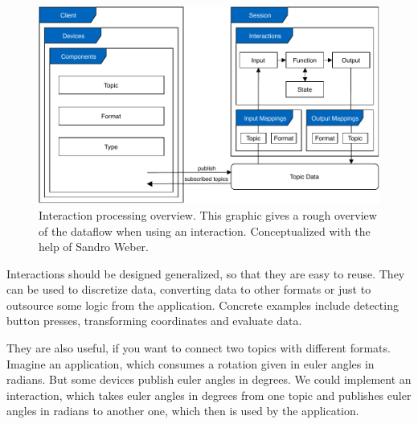 \begin{figure}[htpb]
  \centering
  \includegraphics[width=12cm]{figures/ubii_cd.pdf}
  \caption[UBII Communication Diagram]{Interaction processing overview. This graphic gives a rough overview of the dataflow when using an interaction. Conceptualized with the help of Sandro Weber.}\label{fig:ubii_cd}
\end{figure}

Interactions should be designed generalized, so that they are easy to reuse. They can be used to discretize data, converting data to other formats or just to outsource some logic from the application. Concrete examples include detecting button presses, transforming coordinates and evaluate data.

They are also useful, if you want to connect two topics with different formats. Imagine an application, which consumes a rotation given in euler angles in radians. But some devices publish euler angles in degrees. We could implement an interaction, which takes euler angles in degrees from one topic and publishes euler angles in radians to another one, which then is used by the application.

